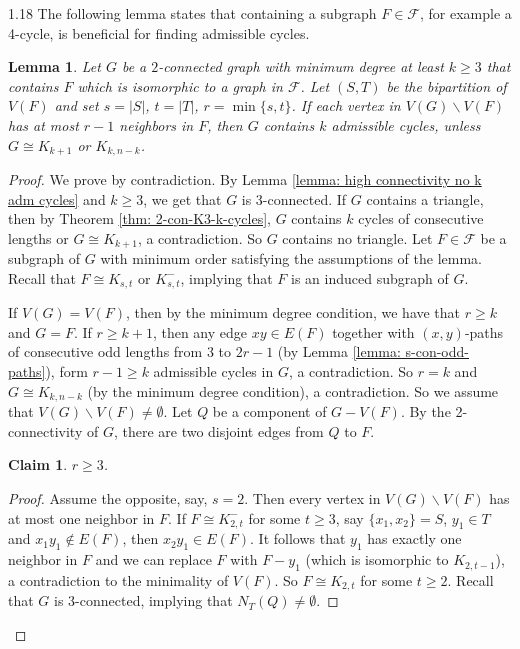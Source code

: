 \documentclass[10pt]{article}
\newtheorem{lemma}[theorem]{Lemma}
\newtheorem{claim}{Claim}
\let\geq\geqslant
\begin{document}
\begin{spacing}{1.18}
   The following lemma states that containing a subgraph $F \in \mathcal{F}$, for example a 4-cycle, is beneficial for finding admissible cycles. 

\begin{lemma}\label{lemma: 2-con-bi-H}
    Let $G$ be a $2$-connected graph with minimum degree at least $k\geqslant 3$ that contains $F$ which is isomorphic to a graph in $\mathcal{F}$. Let $(S,T)$ be the bipartition of $V(F)$ and set $s=|S|$, $t=|T|$, $r=\min\{s,t\}$. If each vertex in $V(G)\backslash V(F)$ has at most $r-1$ neighbors in $F$, then $G$ contains $k$ admissible cycles, unless $G\cong K_{k+1}$ or $K_{k,n-k}$.
\end{lemma}

\begin{proof}
   We prove by contradiction. By Lemma \ref{lemma: high connectivity no k adm cycles} and $k\geqslant 3$, we get that $G$ is 3-connected. If $G$ contains a triangle, then by Theorem \ref{thm: 2-con-K3-k-cycles}, $G$ contains $k$ cycles of consecutive lengths or $G\cong K_{k+1}$, a contradiction. So $G$ contains no triangle. Let $F\in \mathcal{F}$ be a subgraph of $G$ with minimum order satisfying the assumptions of the lemma. Recall that $F\cong K_{s,t}$ or $K_{s,t}^-$, implying that $F$ is an induced subgraph of $G$. 
   
   If $V(G)=V(F)$, then by the minimum degree condition, we have that $r\geqslant k$ and $G=F$. If $r\geqslant k+1$, then any edge $xy\in E(F)$ together with $(x,y)$-paths of consecutive odd lengths from 3 to $2r-1$ (by Lemma \ref{lemma: s-con-odd-paths}), form $r-1\geq k$ admissible cycles in $G$, a contradiction. So $r=k$ and $G\cong K_{k,n-k}$ (by the minimum degree condition), a contradiction. So we assume that $V(G)\backslash V(F)\neq\emptyset$. Let $Q$ be a component of $G-V(F)$. By the 2-connectivity of $G$, there are two disjoint edges from $Q$ to $F$. 
    
\begin{claim}\label{claim: at least 2 neighbors in H}
    $r\geqslant 3$.
\end{claim}

\begin{proof}
    Assume the opposite, say, $s=2$. Then every vertex in $V(G)\backslash V(F)$ has at most one neighbor in $F$. If $F\cong K_{2,t}^-$ for some $t\geqslant 3$, say $\{x_1,x_2\}=S$, $y_1\in T$ and $x_1y_1\notin E(F)$, then $x_2y_1\in E(F)$. It follows that $y_1$ has exactly one neighbor in $F$ and we can replace $F$ with $F-y_1$ (which is isomorphic to $K_{2,t-1}$), a contradiction to the minimality of $V(F)$. So $F\cong K_{2,t}$ for some $t\geqslant 2$. Recall that $G$ is 3-connected, implying that $N_T(Q)\neq\emptyset$.


\end{proof}
\end{proof}
\end{spacing}
\end{document}
